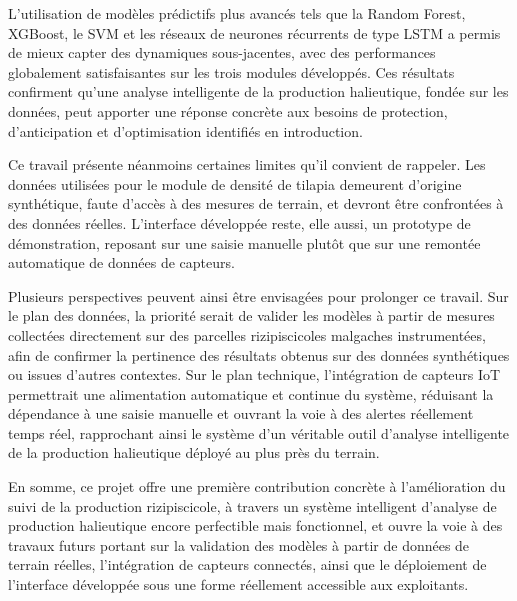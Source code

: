 \documentclass[a4paper,12pt, oneside]{article}
\begin{document}
L'utilisation de modèles prédictifs plus avancés tels que la Random Forest, XGBoost, le SVM et les réseaux de neurones récurrents de type LSTM a permis de mieux capter des dynamiques sous-jacentes, avec des performances globalement satisfaisantes sur les trois modules développés. Ces résultats confirment qu'une analyse intelligente de la production halieutique, fondée sur les données, peut apporter une réponse concrète aux besoins de protection, d'anticipation et d'optimisation identifiés en introduction.

Ce travail présente néanmoins certaines limites qu'il convient de rappeler. Les données utilisées pour le module de densité de tilapia demeurent d'origine synthétique, faute d'accès à des mesures de terrain, et devront être confrontées à des données réelles. L'interface développée reste, elle aussi, un prototype de démonstration, reposant sur une saisie manuelle plutôt que sur une remontée automatique de données de capteurs.

Plusieurs perspectives peuvent ainsi être envisagées pour prolonger ce travail. Sur le plan des données, la priorité serait de valider les modèles à partir de mesures collectées directement sur des parcelles rizipiscicoles malgaches instrumentées, afin de confirmer la pertinence des résultats obtenus sur des données synthétiques ou issues d'autres contextes. Sur le plan technique, l'intégration de capteurs IoT permettrait une alimentation automatique et continue du système, réduisant la dépendance à une saisie manuelle et ouvrant la voie à des alertes réellement temps réel, rapprochant ainsi le système d'un véritable outil d'analyse intelligente de la production halieutique déployé au plus près du terrain.

En somme, ce projet offre une première contribution concrète à l'amélioration du suivi de la production rizipiscicole, à travers un système intelligent d'analyse de production halieutique encore perfectible mais fonctionnel, et ouvre la voie à des travaux futurs portant sur la validation des modèles à partir de données de terrain réelles, l'intégration de capteurs connectés, ainsi que le déploiement de l'interface développée sous une forme réellement accessible aux exploitants.
\end{document}
